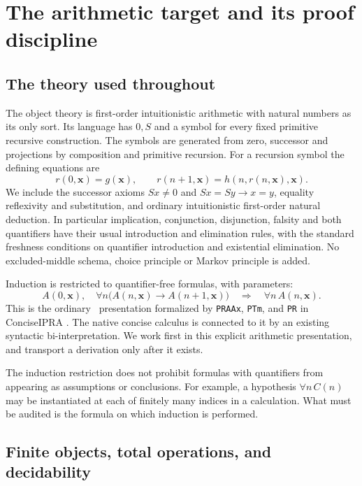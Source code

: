 \section{The arithmetic target and its proof discipline}
\label{sec:foundations}

\subsection{The theory used throughout}

The object theory is first-order intuitionistic arithmetic with natural
numbers as its only sort. Its language has \(0,S\) and a symbol for every
fixed primitive recursive construction. The symbols are generated from
zero, successor and projections by composition and primitive recursion.
For a recursion symbol the defining equations are
\[
 r(0,\boldsymbol x)=g(\boldsymbol x),\qquad
 r(n+1,\boldsymbol x)=h(n,r(n,\boldsymbol x),\boldsymbol x).
\]
We include the successor axioms \(Sx\ne0\) and
\(Sx=Sy\to x=y\), equality reflexivity and substitution, and ordinary
intuitionistic first-order natural deduction. In particular implication,
conjunction, disjunction, falsity and both quantifiers have their usual
introduction and elimination rules, with the standard freshness conditions
on quantifier introduction and existential elimination. No excluded-middle
schema, choice principle or Markov principle is added.

Induction is restricted to quantifier-free formulas, with parameters:
\[
 A(0,\boldsymbol x),\quad
 \forall n\bigl(A(n,\boldsymbol x)\to A(n+1,\boldsymbol x)\bigr)
 \quad\Longrightarrow\quad \forall n\,A(n,\boldsymbol x).
\]
This is the ordinary \ipra\ presentation formalized by
\texttt{PRAAx}, \texttt{PTm}, and \texttt{PR} in ConciseIPRA
\cite{repoCore}. The native concise calculus is connected to it by an
existing syntactic bi-interpretation. We work first in this explicit
arithmetic presentation, and transport a derivation only after it exists.

The induction restriction does not prohibit formulas with quantifiers from
appearing as assumptions or conclusions. For example, a hypothesis
\(\forall n\,C(n)\) may be instantiated at each of finitely many indices in
a calculation. What must be audited is the formula on which induction is
performed.

\subsection{Finite objects, total operations, and decidability}

